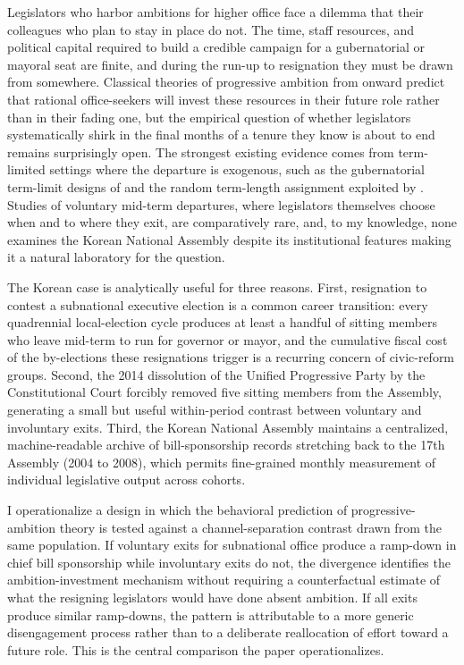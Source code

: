 \documentclass[11pt]{article}
\begin{document}
Legislators who harbor ambitions for higher office face a dilemma that their colleagues who plan to stay in place do not. The time, staff resources, and political capital required to build a credible campaign for a gubernatorial or mayoral seat are finite, and during the run-up to resignation they must be drawn from somewhere. Classical theories of progressive ambition from \citet{schlesinger1966} onward predict that rational office-seekers will invest these resources in their future role rather than in their fading one, but the empirical question of whether legislators systematically shirk in the final months of a tenure they know is about to end remains surprisingly open. The strongest existing evidence comes from term-limited settings where the departure is exogenous, such as the gubernatorial term-limit designs of \citet{besley1995} and the random term-length assignment exploited by \citet{titiunik2017}. Studies of voluntary mid-term departures, where legislators themselves choose when and to where they exit, are comparatively rare, and, to my knowledge, none examines the Korean National Assembly despite its institutional features making it a natural laboratory for the question.

The Korean case is analytically useful for three reasons. First, resignation to contest a subnational executive election is a common career transition: every quadrennial local-election cycle produces at least a handful of sitting members who leave mid-term to run for governor or mayor, and the cumulative fiscal cost of the by-elections these resignations trigger is a recurring concern of civic-reform groups. Second, the 2014 dissolution of the Unified Progressive Party by the Constitutional Court \citep{leehs2014} forcibly removed five sitting members from the Assembly, generating a small but useful within-period contrast between voluntary and involuntary exits. Third, the Korean National Assembly maintains a centralized, machine-readable archive of bill-sponsorship records stretching back to the 17th Assembly (2004 to 2008), which permits fine-grained monthly measurement of individual legislative output across cohorts.

I operationalize a design in which the behavioral prediction of progressive-ambition theory is tested against a channel-separation contrast drawn from the same population. If voluntary exits for subnational office produce a ramp-down in chief bill sponsorship while involuntary exits do not, the divergence identifies the ambition-investment mechanism without requiring a counterfactual estimate of what the resigning legislators would have done absent ambition. If all exits produce similar ramp-downs, the pattern is attributable to a more generic disengagement process rather than to a deliberate reallocation of effort toward a future role. This is the central comparison the paper operationalizes.
\end{document}

